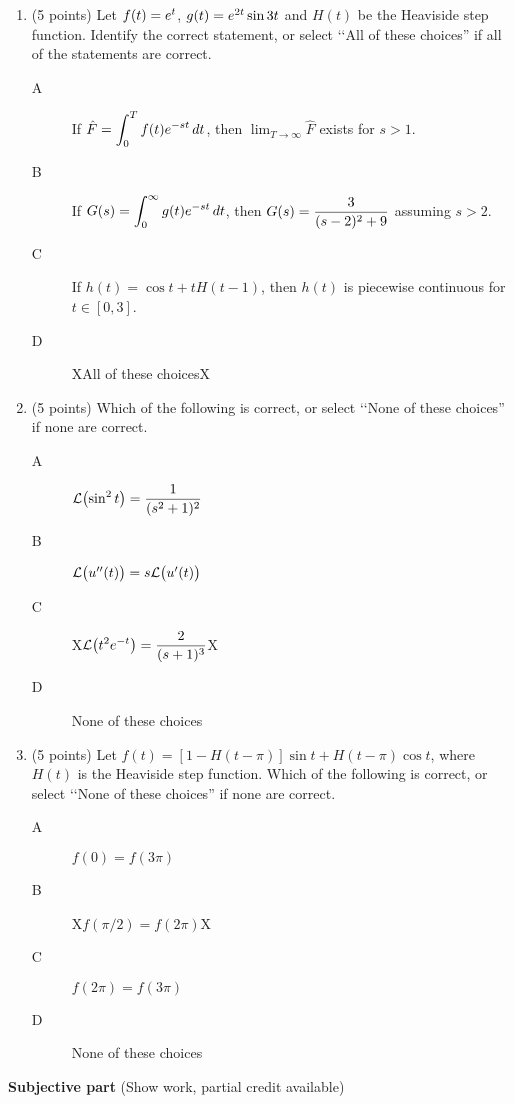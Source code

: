 \documentclass{article}
\begin{document}
\begin{enumerate}
\item (5 points)  Let $f(t)=e\sp{t}$, $g(t)=e\sp{2t}\sin{3t}$ and $H(t)$ be the Heaviside step function.  Identify the correct statement, or select \lq\lq All of these choices'' if all of the statements are correct.
\begin{description}
\item[A] If $\displaystyle{\hat{F}=\int_0\sp{T} f(t)e\sp{-st}\,dt}$, then $\displaystyle{\lim_{T\rightarrow\infty}\hat{F}}$ exists for $s>1$.
\item[B] If $G(s)=\displaystyle{\int_0\sp\infty g(t)e\sp{-st}\,dt}$, then $G(s)=\displaystyle{{3\over(s-2)\sp2+9}}$ assuming $s>2$.
\item[C] If $h(t)=\cos t+tH(t-1)$, then $h(t)$ is piecewise continuous for $t\in[0,3]$.
\item[D] XAll of these choicesX
\end{description}

\item (5 points) Which of the following is correct, or select \lq\lq None of these choices'' if none are correct.
\begin{description}
\item[A] $\displaystyle{{\cal L}\bigl(\sin\sp2t\bigr)={1\over(s\sp2+1)\sp2}}$
\item[B] ${\cal L}\bigl(u\sp{\prime\prime}(t)\bigr)=s{\cal L}\bigl(u\sp{\prime}(t)\bigr)$ 
\item[C] X$\displaystyle{{\cal L}\bigl(t\sp2e\sp{-t}\bigr)={2\over(s+1)\sp3}}$X
\item[D] None of these choices
\end{description}

\newpage
\item (5 points) Let $f(t) = [1-H(t-\pi)]\sin t + H(t-\pi) \cos t$, where $H(t)$ is the Heaviside step function.  Which of the following is correct, or select \lq\lq None of these choices'' if none are correct.
\begin{description}
\item[A]  $f(0)=f(3\pi)$
\item[B]  X$f(\pi/2)=f(2\pi)$X
\item[C]  $f(2\pi)=f(3\pi)$
\item[D] None of these choices
\end{description}


\end{enumerate}

\bigskip\bigskip\noindent
{\bf Subjective part} (Show work, partial credit available)
\end{document}

